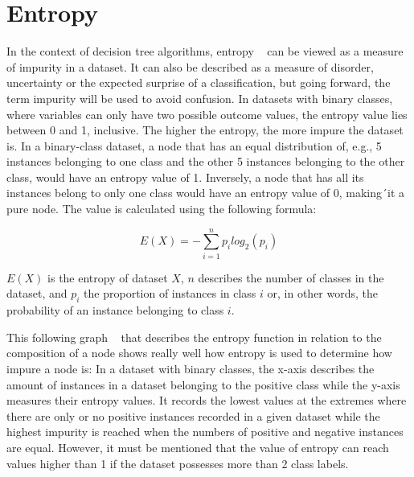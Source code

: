 \section{Entropy} \label{entropy}
In the context of decision tree algorithms, entropy ~\cite{entropy_dash} can be viewed as a measure of impurity in a dataset. It can also be described as a measure of disorder, uncertainty or the expected surprise of a classification, but going forward, the term impurity will be used to avoid confusion. In datasets with binary classes, where variables can only have two possible outcome values, the entropy value lies between 0 and 1, inclusive. The higher the entropy, the more impure the dataset is. In a binary-class dataset, a node that has an equal distribution of, e.g., 5 instances belonging to one class and the other 5 instances belonging to the other class, would have an entropy value of 1. Inversely, a node that has all its instances belong to only one class would have an entropy value of 0, making´it a pure node.
The value is calculated using the following formula:


\[ E(X) = -\sum_{i=1}^{n} {p_i} {log_2 (p_i)} \]


$E(X)$ is the entropy of dataset $X$, $n$ describes the number of classes in the dataset, and $p_i$ the proportion of instances in class $i$ or, in other words, the probability of an instance belonging to class $i$.

This following graph ~\cite{entropy_T} that describes the entropy function in relation to the composition of a node shows really well how entropy is used to determine how impure a node is:
In a dataset with binary classes, the x-axis describes the amount of instances in a dataset belonging to the positive class while the y-axis measures their entropy values. It records the lowest values at the extremes where there are only or no positive instances recorded in a given dataset while the highest impurity is reached when the numbers of positive and negative instances are equal.
However, it must be mentioned that the value of entropy can reach values higher than 1 if the dataset possesses more than 2 class labels. 


